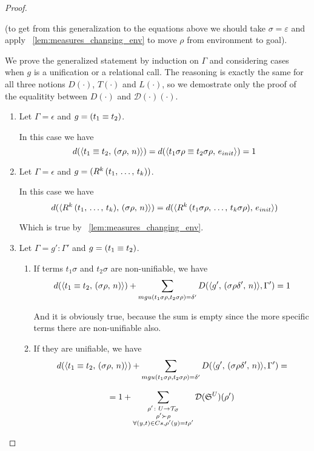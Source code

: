 \begin{proof}
\begin{enumerate}
(to get from this generalization to the equations above we should take $\sigma = \varepsilon$ and apply \lemmaword~\ref{lem:measures_changing_env} to move $\rho$ from environment to goal).

We prove the generalized statement by induction on $\Gamma$ and considering cases when $g$ is a unification or a relational call. The reasoning is exactly the same for all three notions $D(\cdot)$, $T(\cdot)$ and $L(\cdot)$, so we demostrate only the proof of the equalitity between $D(\cdot)$ and $\mathcal{D}(\cdot)(\cdot)$.

	\begin{enumerate}

	\item Let $\Gamma = \epsilon$ and $g = (t_1 \equiv t_2)$.
	
	In this case we have \[ d(\langle t_1 \equiv t_2 ,\, (\sigma \rho ,\, n) \rangle) = d(\langle t_1 \sigma \rho \equiv t_2 \sigma \rho ,\, e_{init} \rangle) = 1 \]
	
	\item Let $\Gamma = \epsilon$ and $g = (R^k\,(t_1, \, \dots, \, t_k))$.
	
	In this case we have \[ d(\langle R^k\,(t_1, \, \dots, \, t_k) ,\, (\sigma \rho ,\, n) \rangle) = d(\langle R^k\,(t_1 \sigma \rho, \, \dots, \, t_k \sigma \rho) ,\, e_{init} \rangle) \]
	
	Which is true by \lemmaword~\ref{lem:measures_changing_env}.
	
	\item Let $\Gamma = g' : \Gamma'$ and $g = (t_1 \equiv t_2)$.
	
	\begin{enumerate}
	
	    \item If terms $t_1 \sigma$ and $t_2 \sigma$ are non-unifiable, we have \[ d(\langle t_1 \equiv t_2 ,\, (\sigma \rho ,\, n) \rangle) + \sum\limits_{mgu(t_1 \sigma \rho, t_2 \sigma \rho) = \delta'} D(\langle g' ,\, (\sigma \rho \delta' ,\, n) \rangle, \Gamma') = 1 \]
	    
	    And it is obviously true, because the sum is empty since the more specific terms there are non-unifiable also.
	
	    \item If they are unifiable, we have \[ d(\langle t_1 \equiv t_2 ,\, (\sigma \rho ,\, n) \rangle) + \sum\limits_{mgu(t_1 \sigma \rho, t_2 \sigma \rho) = \delta'} D(\langle g' ,\, (\sigma \rho \delta' ,\, n) \rangle, \Gamma') = \]
	
	\[ = 1 +
      \sum\limits_{\substack{ \rho' \colon U \to \mathcal{T}_{\varnothing} \\
                                      \rho' \succ \rho \\
                                      \forall (y, t) \in Cs, \rho'(y) = t \rho'  }}
           \mathcal{D}({\mathfrak{S}}^{U})(\rho')  \]
           

\end{enumerate}
\end{enumerate}
\end{enumerate}
\end{proof}
